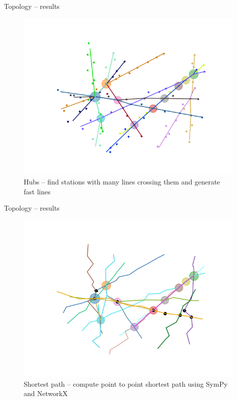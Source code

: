 \begin{frame}{Topology -- results}
	\begin{figure}
		\centering
		\includegraphics[width=0.7\linewidth]{images/net_7.png}
		\caption{Hubs -- find stations with many lines crossing them and generate fast lines}
	\end{figure}
\end{frame}
\begin{frame}{Topology -- results}
	\begin{figure}
		\centering
		\includegraphics[width=0.7\linewidth]{images/net_8.png}
		\caption{Shortest path -- compute point to point shortest path using SymPy and NetworkX}
	\end{figure}
\end{frame}


